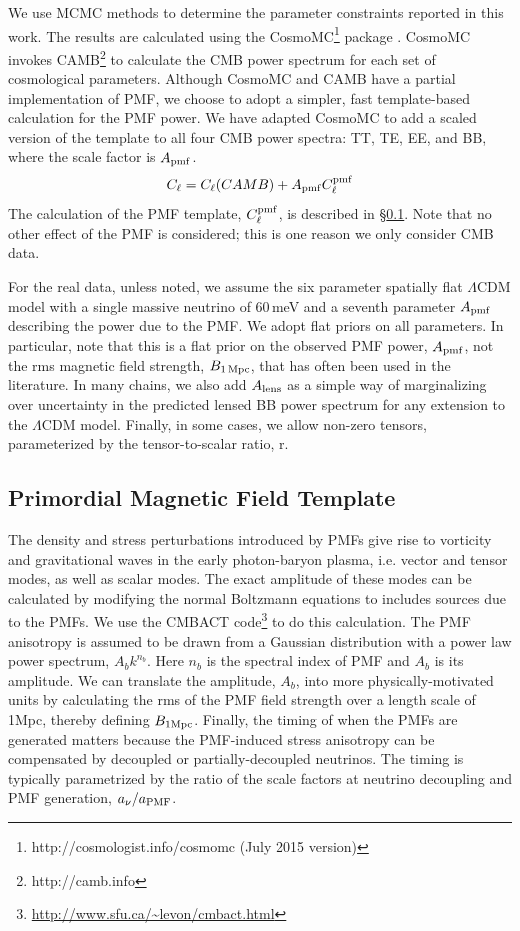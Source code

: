 \documentclass[apj]{emulateapj}
\newcommand{\cpmf}{\ensuremath{C_{\ell}^{\rm pmf}}}
\newcommand{\apmf}{\ensuremath{A_{\rm pmf}}}
\newcommand{\bpmf}{\ensuremath{B_{\rm 1\,Mpc}}}
\newcommand{\alens}{\ensuremath{A_{\rm lens}}}
\newcommand{\lcdm}{\ensuremath{\Lambda}CDM}
\newcommand{\be}{\begin{equation}}
\newcommand{\ee}{\end{equation}}
\begin{document}
We use MCMC methods to determine the parameter constraints reported in this work. 
The results are calculated using  the {\textsc CosmoMC}\footnote{http://cosmologist.info/cosmomc (July 2015 version)} package \citep{lewis02b}. 
CosmoMC invokes  CAMB\footnote{http://camb.info}  \citep{lewis00} to calculate the CMB power spectrum for each set of cosmological parameters. 
Although CosmoMC and CAMB have a partial implementation of PMF, we choose to adopt a simpler, fast template-based calculation for the PMF power. 
We have adapted CosmoMC to add a scaled version of the template to all four CMB power spectra: TT, TE, EE, and BB, where the scale factor is \apmf. 
\be
C_\ell = C_\ell (CAMB) + \apmf \cpmf
\ee
The calculation of the PMF template, \cpmf, is described in \S\ref{sec:template}. 
Note that no other effect of the PMF is considered; this is one reason we only consider CMB data.

For the real data, unless noted, we assume the six parameter spatially flat \lcdm{} model with a single massive neutrino of 60\,meV and a seventh parameter \apmf{} describing the power due to the PMF. 
We adopt flat priors on all parameters. 
In particular, note that this is a flat prior on the observed PMF power, $\apmf$, not the rms magnetic field strength, \bpmf, that has often been used in the literature. 
In many chains, we also add \alens{} as a simple way of marginalizing over uncertainty in the predicted lensed BB power spectrum for any extension to the \lcdm{} model. 
Finally, in some cases, we allow non-zero tensors, parameterized by the tensor-to-scalar ratio, r. 

\subsection{Primordial Magnetic Field Template}
\label{sec:template}

The density and stress perturbations introduced by PMFs give rise to vorticity and gravitational waves in the early photon-baryon  plasma, i.e. vector and tensor modes, as well as scalar modes. 
The exact amplitude of these modes can be calculated by modifying the normal Boltzmann equations to includes sources due to the PMFs. 
We use the CMBACT code\footnote{\url{http://www.sfu.ca/~levon/cmbact.html}} \citep{pogosian99}  to do this calculation. 
The PMF anisotropy is assumed to be drawn from a Gaussian distribution with a power law power spectrum, $A_b k^{n_b}$. 
Here $n_b$ is the spectral index of PMF and $A_b$ is its amplitude. 
We can translate the amplitude, $A_b$, into more physically-motivated units by calculating the rms of the PMF field strength over a length scale of 1\rm{Mpc}, thereby defining $B_{\rm{1Mpc}}$. 
Finally, the timing of when the PMFs are generated matters because the PMF-induced stress anisotropy can be compensated by decoupled or partially-decoupled neutrinos. 
The timing is typically parametrized by the ratio of the scale factors at neutrino decoupling and PMF generation, $a_{\nu}/a_{\rm{PMF}}$. 
\end{document}
